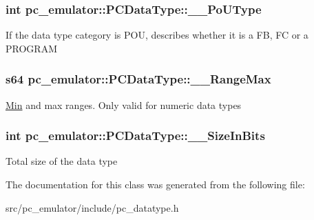 \subsubsection[{\texorpdfstring{\+\_\+\+\_\+\+Po\+U\+Type}{__PoUType}}]{\setlength{\rightskip}{0pt plus 5cm}int pc\+\_\+emulator\+::\+P\+C\+Data\+Type\+::\+\_\+\+\_\+\+Po\+U\+Type}\hypertarget{classpc__emulator_1_1PCDataType_ac2d244cddd2a30b343aae3af6f291736}{}\label{classpc__emulator_1_1PCDataType_ac2d244cddd2a30b343aae3af6f291736}
If the data type category is P\+OU, describes whether it is a FB, FC or a P\+R\+O\+G\+R\+AM 
\subsubsection[{\texorpdfstring{\+\_\+\+\_\+\+Range\+Max}{__RangeMax}}]{\setlength{\rightskip}{0pt plus 5cm}s64 pc\+\_\+emulator\+::\+P\+C\+Data\+Type\+::\+\_\+\+\_\+\+Range\+Max}\hypertarget{classpc__emulator_1_1PCDataType_a8b4ce729396059f7fe634a5f35f9a2ca}{}\label{classpc__emulator_1_1PCDataType_a8b4ce729396059f7fe634a5f35f9a2ca}
\hyperlink{classpc__emulator_1_1Min}{Min} and max ranges. Only valid for numeric data types 
\subsubsection[{\texorpdfstring{\+\_\+\+\_\+\+Size\+In\+Bits}{__SizeInBits}}]{\setlength{\rightskip}{0pt plus 5cm}int pc\+\_\+emulator\+::\+P\+C\+Data\+Type\+::\+\_\+\+\_\+\+Size\+In\+Bits}\hypertarget{classpc__emulator_1_1PCDataType_a7556d336d3903549f2be43aa5d28763d}{}\label{classpc__emulator_1_1PCDataType_a7556d336d3903549f2be43aa5d28763d}
Total size of the data type 

The documentation for this class was generated from the following file\+:\begin{DoxyCompactItemize}
\item 
src/pc\+\_\+emulator/include/pc\+\_\+datatype.\+h\end{DoxyCompactItemize}
